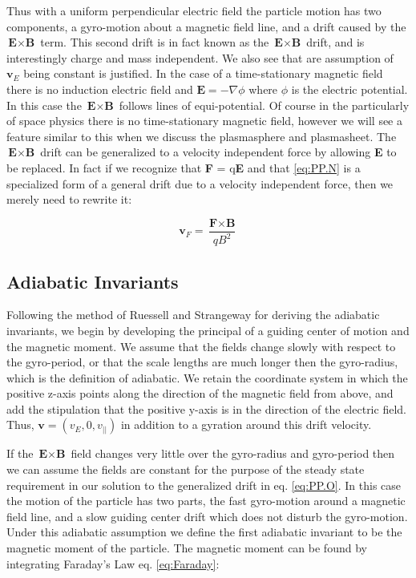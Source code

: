 \documentclass[utf8]{report}
\begin{document}
Thus with a uniform perpendicular electric field the particle motion has two components, a gyro-motion about a magnetic field line, and a drift caused by the $\textbf{E} \times \textbf{B}$ term. This second drift is in fact known as the $\textbf{E} \times \textbf{B}$ drift, and is interestingly charge and mass independent. We also see that are assumption of $\textbf{v}_{E}$ being constant is justified. In the case of a time-stationary magnetic field there is no induction electric field and $\textbf{E} = -\nabla \phi$ where $\phi$ is the electric potential. In this case the $\textbf{E} \times \textbf{B}$ follows lines of equi-potential. Of course in the particularly of space physics there is no time-stationary magnetic field, however we will see a feature similar to this when we discuss the plasmasphere and plasmasheet. 
The $\textbf{E} \times \textbf{B}$ drift can be generalized to a velocity independent force by allowing \textbf{E} to be replaced. In fact if we recognize that \textbf{F} = q\textbf{E} and that \ref{eq:PP.N} is a specialized form of a general drift due to a velocity independent force, then we merely need to rewrite it: 

\begin{equation}
    \textbf{v}_{F} = \frac{\textbf{F}\times\textbf{B}}{qB^{2}}
    \label{eq:PP.O}
\end{equation}

\subsection{Adiabatic Invariants}

Following the method of Ruessell and Strangeway for deriving the adiabatic invariants, we begin by developing the principal of a guiding center of motion and the magnetic moment. We assume that the fields change slowly with respect to the gyro-period, or that the scale lengths are much longer then the gyro-radius, which is the definition of adiabatic. We retain the coordinate system in which the positive z-axis points along the direction of the magnetic field from above, and add the stipulation that the positive y-axis is in the direction of the electric field. Thus, $\textbf{v} = (v_{E}, 0, v_{||})$ in addition to a gyration around this drift velocity. 

If the $\textbf{E} \times \textbf{B}$ field changes very little over the gyro-radius and gyro-period then we can assume the fields are constant for the purpose of the steady state requirement in our solution to the generalized drift in eq. \ref{eq:PP.O}. In this case the motion of the particle has two parts, the fast gyro-motion around a magnetic field line, and a slow guiding center drift which does not disturb the gyro-motion. Under this adiabatic assumption we define the first adiabatic invariant to be the magnetic moment of the particle. The magnetic moment can be found by integrating Faraday's Law eq. \ref{eq:Faraday}: 
\end{document}
